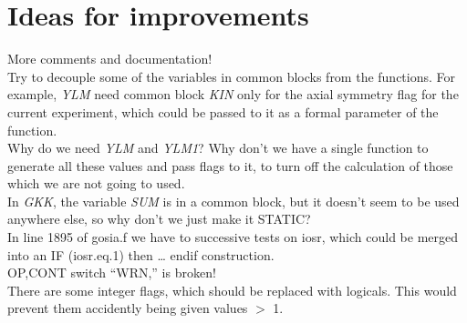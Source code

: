 \chapter{Ideas for improvements}

More comments and documentation!\\

Try to decouple some of the variables in common blocks from the functions.
For example, {\em YLM} need common block {\em KIN} only for the axial
symmetry flag for the current experiment, which could be passed to it as a
formal parameter of the function.\\

Why do we need {\em YLM} and {\em YLM1}? Why don't we have a single function
to generate all these values and pass flags to it, to turn off the
calculation of those which we are not going to used.\\

In {\em GKK}, the variable {\em SUM} is in a common block, but it doesn't
seem to be used anywhere else, so why don't we just make it STATIC?\\

In line 1895 of gosia.f we have to successive tests on iosr, which could be
merged into an IF (iosr.eq.1) then {\ldots} endif construction.\\

OP,CONT switch ``WRN,'' is broken!\\

There are some integer flags, which should be replaced with logicals. This
would prevent them accidently being given values $>$ 1.\\

